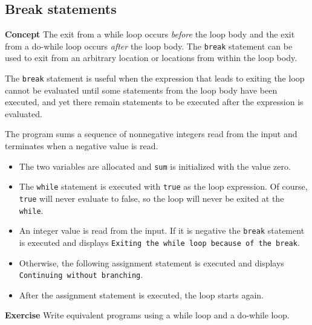 \subsection{Break statements}\label{control.05}

\textbf{Concept} The exit from a while loop occurs \emph{before} the loop body and
the exit from a do-while loop occurs \emph{after} the loop body. 
The \texttt{break} statement can
be used to exit from an arbitrary location or locations from within the loop body.

The \texttt{break} statement is useful when the expression that leads to exiting the loop cannot
be evaluated until some statements from the loop body have been executed,
and yet there remain statements to be executed after the expression is evaluated.


The program sums a sequence of nonnegative integers read from the input and terminates when
a negative value is read.

\begin{itemize}
\item The two variables are allocated and \texttt{sum} is initialized with the value zero.
\item The \texttt{while} statement is executed with \texttt{true} as the loop expression.
Of course, \texttt{true} will never evaluate to false, so the loop will never be exited
at the \texttt{while}.
\item An integer value is read from the input. If it is negative the \texttt{break} statement
is executed and \jel{} displays \texttt{Exiting the while loop because of the break}.
\item Otherwise, the following assignment statement is executed and
\jel{} displays \texttt{Continuing without branching}.
\item After the assignment statement is executed, the loop starts again.
\end{itemize}

\textbf{Exercise} Write equivalent programs using a while loop
and a do-while loop.
